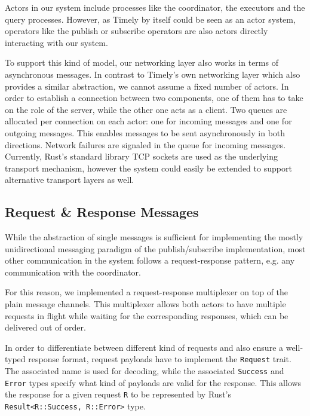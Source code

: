 
Actors in our system include processes like the coordinator, the executors 
and the query processes. However, as Timely by itself could be seen as an
actor system, operators like the publish or subscribe operators are also actors
directly interacting with our system.

To support this kind of model, our networking layer also works in terms of
asynchronous messages. In contrast to Timely's own networking layer which also
provides a similar abstraction, we cannot assume a fixed number of actors.
In order to establish a connection between two components, one of them has to
take on the role of the server, while the other one acts as a client. Two
queues are allocated per connection on each actor: one for incoming messages
and one for outgoing messages. This enables messages to be sent asynchronously
in both directions. Network failures are signaled in the queue for incoming
messages. Currently, Rust's standard library TCP sockets are used as the
underlying transport mechanism, however the system could easily be extended to
support alternative transport layers as well.

\subsection{Request \& Response Messages} \label{sec:reqresp}

While the abstraction of single messages is sufficient for implementing the
mostly unidirectional messaging paradigm of the publish/subscribe implementation,
most other communication in the system follows a request-response pattern,
e.g. any communication with the coordinator.

For this reason, we implemented a request-response multiplexer on
top of the plain message channels. This multiplexer allows both actors to have
multiple requests in flight while waiting for the corresponding responses,
which can be delivered out of order.

In order to differentiate between different kind of requests and also ensure a
well-typed response format, request payloads have to implement the \lstinline{Request}
trait. The associated name is used for decoding, while the associated \lstinline{Success}
and \lstinline{Error} types specify what kind of payloads are valid for the response.
This allows the response for a given request \lstinline{R} to be represented by
Rust's \lstinline{Result<R::Success, R::Error>} type.

